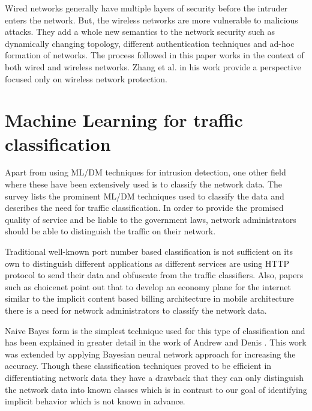 Wired networks generally have multiple layers of security before the intruder enters the network. But, the wireless networks are more vulnerable to malicious attacks. They add a whole new semantics to the network security such as dynamically changing topology, different authentication techniques and ad-hoc formation of networks. The process  followed in this paper works in the context of both wired and wireless networks. Zhang et al. in his work \cite{zhang2003intrusion} provide a perspective focused only on wireless network protection.

\section{Machine Learning for traffic classification}

Apart from using ML/DM techniques for intrusion detection, one other field where these have been extensively used is to classify the network data. The survey \cite{nguyen2008survey} lists the prominent ML/DM techniques used to classify the data and describes the need for traffic classification. In order to provide the promised quality of service and be liable to the government laws, network administrators should be able to distinguish the traffic on their network. 

Traditional well-known port number based classification is not sufficient on its own to distinguish different applications  as different services are using HTTP protocol to send their data and obfuscate from the traffic classifiers. Also, papers such as choicenet \cite{wolf2014choicenet} point out that to develop an economy plane for the internet similar to the implicit content based billing architecture in mobile architecture there is a need for network administrators to classify the network data.

Naive Bayes form is the simplest technique used for this type of classification and has been explained in greater detail in the work of Andrew and Denis \cite{moore2005internet}. This work was extended by applying Bayesian neural network approach \cite{auld2007bayesian} for increasing the accuracy. Though these classification techniques proved to be efficient in differentiating network data they have a drawback that they can only distinguish the network data into known classes which is in contrast to our goal of identifying implicit behavior which is not known in advance.

